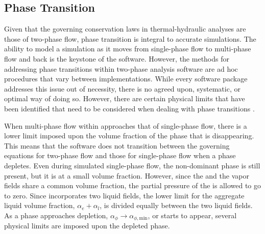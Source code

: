 \subsection{Phase Transition}
\label{subsect:nlnPhaseTransition}
Given that the governing conservation laws in thermal-hydraulic analyses are those of two-phase flow, phase transition is integral to accurate simulations.
The ability to model a simulation as it moves from single-phase flow to multi-phase flow and back is the keystone of the software.
However, the methods for addressing phase transitions within two-phase analysis software are ad hoc procedures that vary between implementations.
While every software package addresses this issue out of necessity, there is no agreed upon, systematic, or optimal way of doing so.
However, there are certain physical limits that have been identified that need to be considered when dealing with phase transitions \cite{Bestion2000}.

When multi-phase flow within \cobra{} approaches that of single-phase flow, there is a lower limit imposed upon the volume fraction of the phase that is disappearing.
This means that the software does not transition between the governing equations for two-phase flow and those for single-phase flow when a phase depletes.
Even during simulated single-phase flow, the non-dominant phase is still present, but it is at a small volume fraction.
However, since the \ncgs{} and the vapor fields share a common volume fraction, the partial pressure of the \ncgs{} is allowed to go to zero. 
Since \cobra{} incorporates two liquid fields, the lower limit for the aggregate liquid volume fraction, $\alpha_e + \alpha_l$, is divided equally between the two liquid fields.
As a phase approaches depletion, $\alpha_{\phi} \rightarrow \alpha_{\phi,\text{min}}$, or starts to appear, several physical limits are imposed upon the depleted phase.

